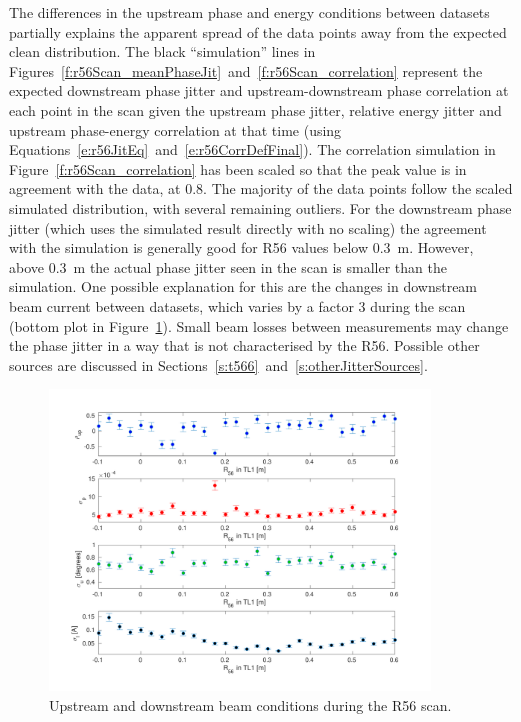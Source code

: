The differences in the upstream phase and energy conditions between datasets partially explains the apparent spread of the data points away from the expected clean distribution. The black ``simulation'' lines in Figures~\ref{f:r56Scan_meanPhaseJit}~and~\ref{f:r56Scan_correlation} represent the expected downstream phase jitter and upstream-downstream phase correlation at each point in the scan given the upstream phase jitter, relative energy jitter and upstream phase-energy correlation at that time (using Equations~\ref{e:r56JitEq}~and~\ref{e:r56CorrDefFinal}). The correlation simulation in Figure~\ref{f:r56Scan_correlation} has been scaled so that the peak value is in agreement with the data, at 0.8. The majority of the data points follow the scaled simulated distribution, with several remaining outliers. For the downstream phase jitter (which uses the simulated result directly with no scaling) the agreement with the simulation is generally good for R56 values below 0.3~m. However, above 0.3~m the actual phase jitter seen in the scan is smaller than the simulation. One possible explanation for this are the changes in downstream beam current between datasets, which varies by a factor 3 during the scan (bottom plot in Figure~\ref{f:r56Scan_upstreamParams}). Small beam losses between measurements may change the phase jitter in a way that is not characterised by the R56. Possible other sources are discussed in Sections~\ref{s:t566}~and~\ref{s:otherJitterSources}.

\begin{figure}
  \centering
  \includegraphics[width=0.9\textwidth]{Figures/propagation/r56Scan_upstreamParams}
  \caption{Upstream and downstream beam conditions during the R56 scan.}
  \label{f:r56Scan_upstreamParams}
\end{figure}

